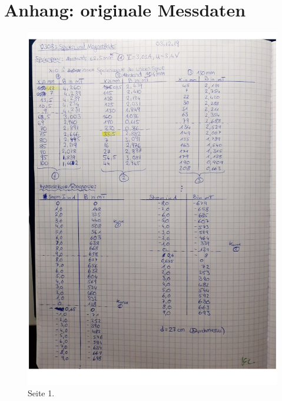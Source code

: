 \section{Anhang: originale Messdaten}
\label{sec:Anhang}
\begin{figure}
    \centering
    \includegraphics[width=\textwidth]{Data2_pic.pdf}
    \caption{Seite 1.}
    \label{fig:data1}
\end{figure}
\pagebreak
